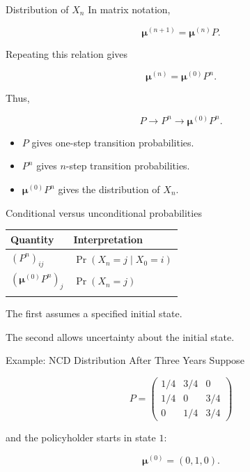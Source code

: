 \documentclass[
  ignorenonframetext,
  aspectratio=169,
]{beamer}
\newcounter{none} %
\providecommand{\tightlist}{%
  \setlength{\itemsep}{0pt}\setlength{\parskip}{0pt}}
\begin{document}
\begin{frame}{Distribution of \(X_n\)}
\protect{}\label{distribution-of-x_n}
In matrix notation,

\[
\boxed{
\boldsymbol{\mu}^{(n+1)}
=\boldsymbol{\mu}^{(n)}P.
}
\]

Repeating this relation gives

\[
\boxed{
\boldsymbol{\mu}^{(n)}
=\boldsymbol{\mu}^{(0)}P^n.
}
\]

Thus,

\[
\boxed{
P
\longrightarrow
P^n
\longrightarrow
\boldsymbol{\mu}^{(0)}P^n.
}
\]

\begin{itemize}
\tightlist
\item
  \(P\) gives one-step transition probabilities.
\item
  \(P^n\) gives \(n\)-step transition probabilities.
\item
  \(\boldsymbol{\mu}^{(0)}P^n\) gives the distribution of \(X_n\).
\end{itemize}
\end{frame}

\begin{frame}{Conditional versus unconditional probabilities}
\protect{}\label{conditional-versus-unconditional-probabilities}
{\def\LTcaptype{none} %
\begin{longtable}[]{@{}ll@{}}
\toprule\noalign{}
Quantity & Interpretation \\
\midrule\noalign{}
\endhead
\((P^n)_{ij}\) & \(\Pr(X_n=j\mid X_0=i)\) \\
\((\boldsymbol{\mu}^{(0)}P^n)_j\) & \(\Pr(X_n=j)\) \\
\bottomrule\noalign{}
\end{longtable}
}

The first assumes a specified initial state.

The second allows uncertainty about the initial state.
\end{frame}

\begin{frame}{Example: NCD Distribution After Three Years}
\protect{}\label{example-ncd-distribution-after-three-years}
Suppose

\[
P=
\begin{pmatrix}
1/4&3/4&0\\
1/4&0&3/4\\
0&1/4&3/4
\end{pmatrix}
\]

and the policyholder starts in state \(1\):

\[
\boldsymbol{\mu}^{(0)}
=
(0,1,0).
\]
\end{frame}
\end{document}
